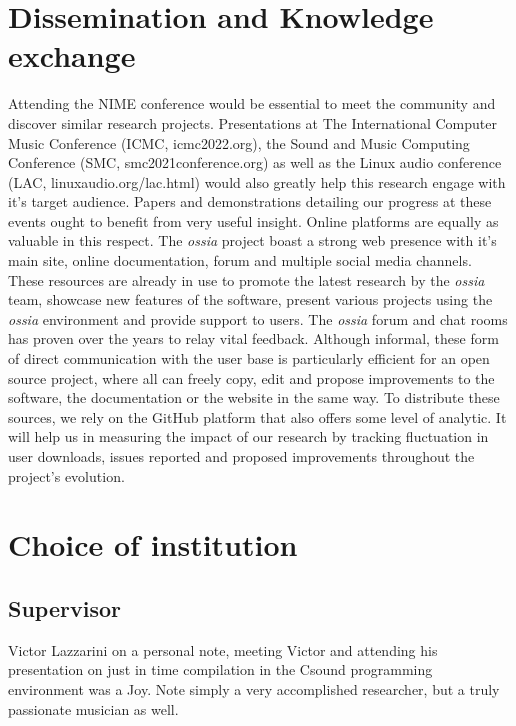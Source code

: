 \documentclass[journal,onecolumn]{IEEEtran}
\begin{document}
\section{Dissemination and Knowledge exchange} %
Attending the NIME conference would be essential to meet the community and discover similar research projects. Presentations at The International Computer Music Conference (ICMC, icmc2022.org), the Sound and Music Computing Conference (SMC, smc2021conference.org) as well as the Linux audio conference (LAC, linuxaudio.org/lac.html) would also greatly help this research engage with it's target audience. Papers and demonstrations detailing our progress at these events ought to benefit from very useful insight. Online platforms are equally as valuable in this respect. The \textit{ossia} project boast a strong web presence with it's main site, online documentation, forum and multiple social media channels. These resources are already in use to promote the latest research by the \textit{ossia} team, showcase new features of the software, present various projects using the \textit{ossia} environment and provide support to users. The \textit{ossia} forum and chat rooms has proven over the years to relay vital feedback. Although informal, these form of direct communication with the user base is particularly efficient for an open source project, where all can freely copy, edit and propose improvements to the software, the documentation or the website in the same way. To distribute these sources, we rely on the GitHub platform that also offers some level of analytic. It will help us in measuring the impact of our research by tracking fluctuation in user downloads, issues reported and proposed improvements throughout the project's evolution. 

\section{Choice of institution} %
\subsection{Supervisor}
Victor Lazzarini 
on a personal note, meeting Victor and attending his presentation on just in time compilation in the Csound programming environment was a Joy. Note simply a very accomplished researcher, but a truly passionate musician as well.
\end{document}

